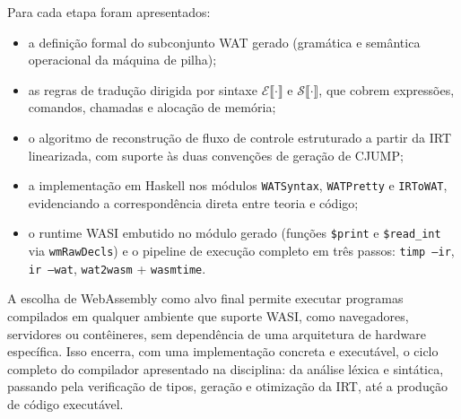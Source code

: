 Para cada etapa foram apresentados:
\begin{itemize}
  \item a definição formal do subconjunto WAT gerado (gramática e semântica
    operacional da máquina de pilha);
  \item as regras de tradução dirigida por sintaxe
    $\mathcal{E}\llbracket \cdot \rrbracket$ e
    $\mathcal{S}\llbracket \cdot \rrbracket$, que cobrem expressões,
    comandos, chamadas e alocação de memória;
  \item o algoritmo de reconstrução de fluxo de controle estruturado a partir
    da IRT linearizada, com suporte às duas convenções de geração de CJUMP;
  \item a implementação em Haskell nos módulos \texttt{WATSyntax},
    \texttt{WATPretty} e \texttt{IRToWAT}, evidenciando a correspondência
    direta entre teoria e código;
  \item o runtime WASI embutido no módulo gerado (funções \texttt{\$print} e
    \texttt{\$read\_int} via \texttt{wmRawDecls}) e o pipeline de execução
    completo em três passos: \texttt{timp --ir}, \texttt{ir --wat},
    \texttt{wat2wasm} + \texttt{wasmtime}.
\end{itemize}

A escolha de WebAssembly como alvo final permite executar programas compilados
em qualquer ambiente que suporte WASI, como navegadores, servidores ou contêineres,
sem dependência de uma arquitetura de hardware específica.  Isso encerra, com
uma implementação concreta e executável, o ciclo completo do compilador
apresentado na disciplina: da análise léxica e sintática, passando pela
verificação de tipos, geração e otimização da IRT, até a produção de código
executável.
